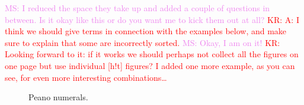 \documentclass[letterpaper,11pt]{article}
\newcommand{\KR}[1]{\textcolor{red}{KR: #1}}
\newcommand{\MS}[1]{\textcolor{violet}{MS: #1}}
\begin{document}
\MS{I reduced the space they take up and added a couple of questions in between. Is it okay like
  this or do you want me to kick them out at all?}  \KR{A: I think we should give terms in
  connection with the examples below, and make sure to explain that some are incorrectly sorted.}
\MS{Okay, I am on it!} \KR{Looking forward to it: if it works we should perhaps not collect all the
  figures on one page but use individual [h!t] figures? I added one more example, as you can see, for
even more interesting combinations…}

\begin{figure}[h!t]
  \vspace*{-1em}
  \caption{Peano numerals.}
  \label{fig:peano}
\end{figure}
\end{document}
